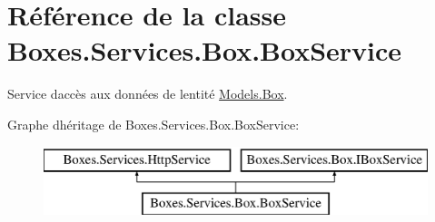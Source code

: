 \hypertarget{class_boxes_1_1_services_1_1_box_1_1_box_service}{}\section{Référence de la classe Boxes.\+Services.\+Box.\+Box\+Service}
\label{class_boxes_1_1_services_1_1_box_1_1_box_service}


Service d\textquotesingle{}accès aux données de l\textquotesingle{}entité \hyperlink{class_boxes_1_1_models_1_1_box}{Models.\+Box}.  


Graphe d\textquotesingle{}héritage de Boxes.\+Services.\+Box.\+Box\+Service\+:\begin{figure}[H]
\begin{center}
\leavevmode
\includegraphics[height=2.000000cm]{class_boxes_1_1_services_1_1_box_1_1_box_service}
\end{center}
\end{figure}
